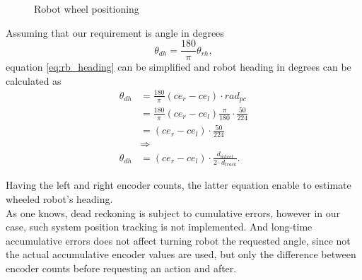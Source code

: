 \begin{figure}[!ht]
	\centering
	\caption{Robot wheel positioning}
	\label{fig:rb_wheel_graph}
\end{figure}
Assuming that our requirement is angle in degrees
$$
\theta_{dh} =  \frac{180}{\pi} \theta_{rh},   
$$
equation \ref{eq:rb_heading} can be simplified and robot heading in degrees can be calculated as
\begin{align*}
\theta_{dh} 
& = \frac{180}{\pi} (ce_{r} - ce_{l} ) \cdot rad_{pc} 								\\
& = \frac{180}{\pi} (ce_{r} - ce_{l} )   \frac{\pi}{180}\cdot \frac{ 50 }{ 224 } 	\\
& = (ce_{r} - ce_{l} ) \cdot \frac{ 50 }{ 224 } 									\\
& \Longrightarrow \\
\theta_{dh}
& = (ce_{r} - ce_{l} ) \cdot \frac{ d_{wheel} }{ 2\cdot d_{track} } .
\end{align*}

Having the left and right encoder counts, the latter equation enable to estimate wheeled robot's heading.
\\
As one knows, dead reckoning is subject to cumulative errors, however in our case, such system position tracking is not implemented. And long-time accumulative errors does not affect turning robot the requested angle, since not the actual accumulative encoder values are used, but only the difference between encoder counts before requesting an action and after.

